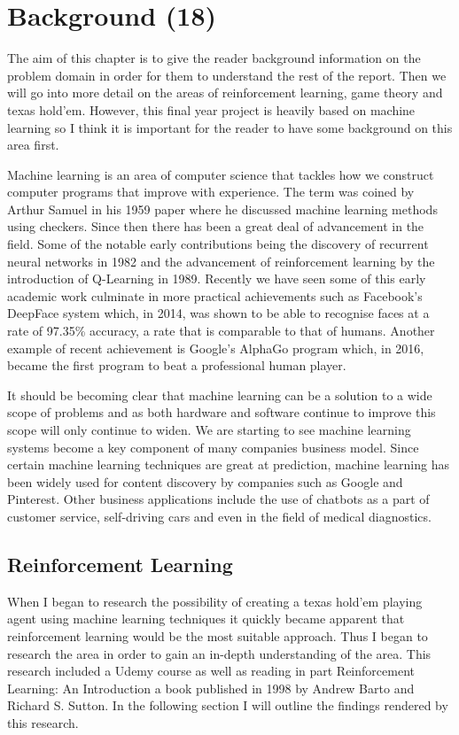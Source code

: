 \chapter{Background (18)}
\label{ch:background}

The aim of this chapter is to give the reader background information on the problem domain in order for them
to understand the rest of the report.
Then we will go into more detail on the areas of reinforcement learning, game theory and texas hold'em.
However, this final year project is heavily based on machine learning so I think it is important for the reader to have
some background on this area first.

Machine learning is an area of computer science that tackles how we construct computer programs that improve
with experience\citep{mitchell1997machine}.
The term was coined by Arthur Samuel in his 1959 paper where he discussed machine learning methods using
checkers.
Since then there has been a great deal of advancement in the field.
Some of the notable early contributions being the discovery of recurrent neural networks in 1982 and
the advancement of reinforcement learning by the introduction of Q-Learning in 1989.
Recently we have seen some of this early academic work culminate in more practical achievements such as
Facebook's DeepFace system which, in 2014,  was shown to be able to recognise faces at a rate of 97.35\% accuracy,
a rate that is comparable to that of humans.
Another example of recent achievement is Google's AlphaGo program which, in 2016, became the first program to beat
a professional human player.

It should be becoming clear that machine learning can be a solution to a wide scope of problems and as
both hardware and software continue to improve this scope will only continue to widen.
We are starting to see machine learning systems become a key component of many companies business model.
Since certain machine learning techniques are great at prediction, machine learning has been widely used
for content discovery by companies such as Google and Pinterest.
Other business applications include the use of chatbots as a part of customer service, self-driving cars
and even in the field of medical diagnostics.


\section{Reinforcement Learning}\label{sec:reinforcementLearning}
When I began to research the possibility of creating a texas hold'em playing agent using machine learning techniques it
quickly became apparent that reinforcement learning would be the most suitable approach.
Thus I began to research the area in order to gain an in-depth understanding of the area.
This research included a Udemy course as well as reading in part Reinforcement Learning: An Introduction
a book published in 1998 by Andrew Barto and Richard S. Sutton.
In the following section I will outline the findings rendered by this research.

